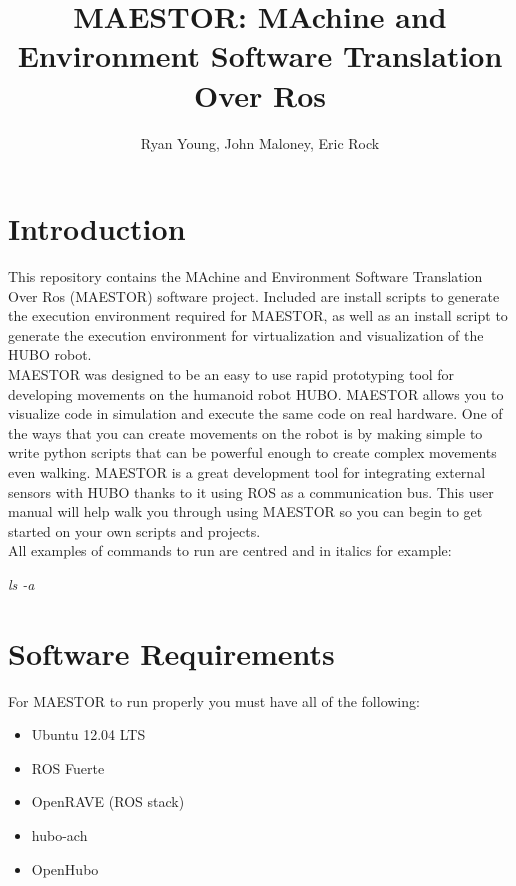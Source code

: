 \documentclass[12pt]{article}
\author{Ryan Young, John Maloney, Eric Rock}
\date{}
\begin{document}
\title{MAESTOR: MAchine and Environment Software Translation Over Ros}
\maketitle
\pagebreak
\tableofcontents
\pagebreak
\section{Introduction}

This repository contains the MAchine and Environment Software Translation Over Ros (MAESTOR) software project. Included are install scripts to generate the execution environment required for MAESTOR, as well as an install script to generate the execution environment for virtualization and visualization of the HUBO robot.\\

MAESTOR was designed to be an easy to use rapid prototyping tool for developing movements on the humanoid robot HUBO. MAESTOR allows you to visualize code in simulation and execute the same code on real hardware. One of the ways that you can create movements on the robot is by making simple to write python scripts that can be powerful enough to create complex movements even walking. MAESTOR is a great development tool for integrating external sensors with HUBO thanks to it using ROS as a communication bus. This user manual will help walk you through using MAESTOR so you can begin to get started on your own scripts and projects.\\ 

\noindent
All examples of commands to run are centred and in italics for example:
\begin{center}
\textit{ls -a}
\end{center}

\section{Software Requirements}
For MAESTOR to run properly you must have all of the following:
\begin{itemize}
	\item Ubuntu 12.04 LTS
	\item ROS Fuerte
	\item OpenRAVE (ROS stack)
	\item hubo-ach
	\item OpenHubo
\end{itemize}
\end{document}
